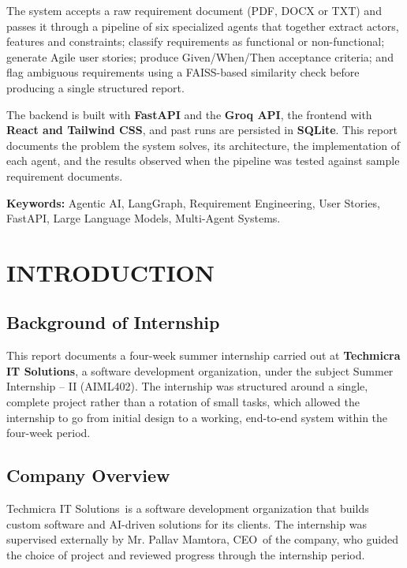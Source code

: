 \documentclass[12pt,a4paper,openany]{report}
\newcommand{\externalguide}{Mr. Pallav Mamtora}
\newcommand{\externaltitle}{CEO}
\newcommand{\company}{Techmicra IT Solutions}
\begin{document}
The system accepts a raw requirement document (PDF, DOCX or TXT) and
passes it through a pipeline of six specialized agents that together
extract actors, features and constraints; classify requirements as
functional or non-functional; generate Agile user stories; produce
Given/When/Then acceptance criteria; and flag ambiguous requirements
using a FAISS-based similarity check before producing a single structured
report.

The backend is built with \textbf{FastAPI} and the \textbf{Groq API}, the
frontend with \textbf{React and Tailwind CSS}, and past runs are
persisted in \textbf{SQLite}. This report documents the problem the
system solves, its architecture, the implementation of each agent, and
the results observed when the pipeline was tested against sample
requirement documents.

\textbf{Keywords:} Agentic AI, LangGraph, Requirement Engineering, User
Stories, FastAPI, Large Language Models, Multi-Agent Systems.
\clearpage

\tableofcontents
\clearpage
\listoffigures
\clearpage

\pagestyle{fancy}

\chapter{INTRODUCTION}

\section{Background of Internship}
This report documents a four-week summer internship carried out at
\textbf{\company}, a software development organization, under the
subject Summer Internship -- II (AIML402). The internship was structured
around a single, complete project rather than a rotation of small tasks,
which allowed the internship to go from initial design to a working,
end-to-end system within the four-week period.

\section{Company Overview}
\company\ is a software development organization that builds custom
software and AI-driven solutions for its clients. The internship was
supervised externally by \externalguide, \externaltitle\ of the company,
who guided the choice of project and reviewed progress through the
internship period.
\end{document}
